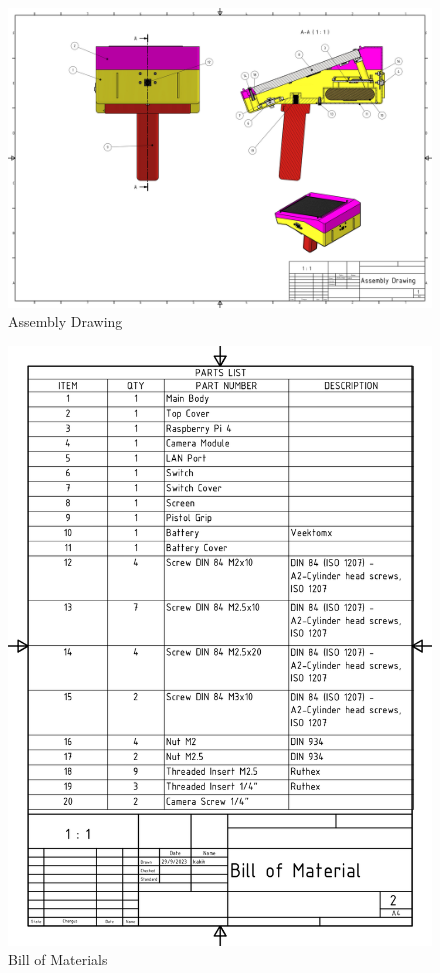 \begin{figure}[H]
    \centering
    \includegraphics[width=1.2\linewidth, angle = 90]{texs/appendix/data/technicaldrawing/assembly.jpg}
    \caption{Assembly Drawing}
    \label{fig:cad-drawing-assembly}
\end{figure}

\begin{figure}[H]
    \centering
    \includegraphics[width=\linewidth]{texs/appendix/data/technicaldrawing/bom.jpg}
    \caption{Bill of Materials}
    \label{fig:cad-drawing-bom}
\end{figure}

